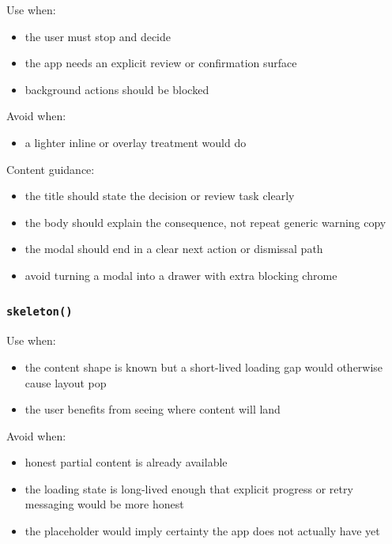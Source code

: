 Use when:

\begin{itemize}
\tightlist
\item
  the user must stop and decide
\item
  the app needs an explicit review or confirmation surface
\item
  background actions should be blocked
\end{itemize}

Avoid when:

\begin{itemize}
\tightlist
\item
  a lighter inline or overlay treatment would do
\end{itemize}

Content guidance:

\begin{itemize}
\tightlist
\item
  the title should state the decision or review task clearly
\item
  the body should explain the consequence, not repeat generic warning copy
\item
  the modal should end in a clear next action or dismissal path
\item
  avoid turning a modal into a drawer with extra blocking chrome
\end{itemize}

\subsubsection{\texorpdfstring{\texttt{s\allowbreak{}k\allowbreak{}e\allowbreak{}l\allowbreak{}e\allowbreak{}t\allowbreak{}o\allowbreak{}n\allowbreak{}(\allowbreak{})}}{}}\label{record-023-skeleton}

Use when:

\begin{itemize}
\tightlist
\item
  the content shape is known but a short-lived loading gap would otherwise cause layout pop
\item
  the user benefits from seeing where content will land
\end{itemize}

Avoid when:

\begin{itemize}
\tightlist
\item
  honest partial content is already available
\item
  the loading state is long-lived enough that explicit progress or retry messaging would be more honest
\item
  the placeholder would imply certainty the app does not actually have yet
\end{itemize}


